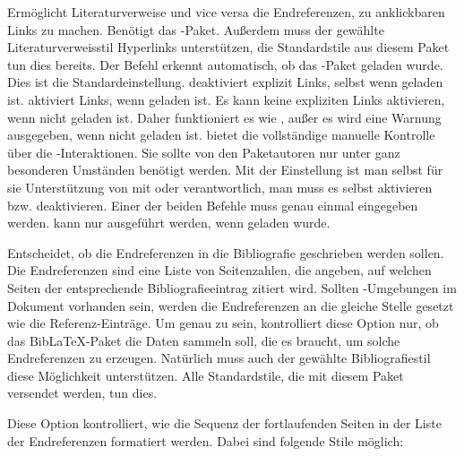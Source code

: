 \documentclass{ltxdockit}[2011/03/25]
\newcommand*{\biblatex}{BibLaTeX\xspace}
\begin{document}
\begin{optionlist}
Ermöglicht Literaturverweise und vice versa die Endreferenzen, zu anklickbaren
Links zu machen. Benötigt das -Paket. Außerdem muss der gewählte
Literaturverweisstil Hyperlinks unterstützen, die Standardstile aus diesem Paket
tun dies bereits. Der Befehl  erkennt automatisch, ob das
-Paket geladen wurde. Dies ist die Standardeinstellung.  deaktiviert explizit Links, selbst wenn 
geladen ist.  aktiviert Links, wenn  geladen
ist. Es kann keine expliziten Links aktivieren, wenn  nicht
geladen ist. Daher funktioniert es wie , außer es wird eine Warnung ausgegeben, wenn  nicht geladen ist.  bietet die vollständige manuelle Kontrolle über die -Interaktionen. Sie sollte von den Paketautoren nur unter ganz besonderen Umständen benötigt werden. Mit der Einstellung 
ist man selbst für sie Unterstützung von  mit  oder  verantwortlich,
man muss es selbst aktivieren bzw. deaktivieren. Einer der beiden Befehle
muss genau einmal eingegeben werden.  kann nur
ausgeführt werden, wenn  geladen wurde.


Entscheidet, ob die Endreferenzen in die Bibliografie geschrieben werden
sollen. Die Endreferenzen sind eine Liste von Seitenzahlen, die angeben, auf welchen
Seiten der entsprechende Bibliografieeintrag zitiert wird. Sollten
-Umgebungen im Dokument vorhanden sein, werden die Endreferenzen
an die gleiche Stelle gesetzt wie die Referenz-Einträge. Um genau zu sein,
kontrolliert diese Option nur, ob das \biblatex-Paket die Daten sammeln
soll, die es braucht, um solche Endreferenzen zu erzeugen. Natürlich muss auch
der gewählte Bibliografiestil diese Möglichkeit unterstützen. Alle Standardstile, die
mit diesem Paket versendet werden, tun dies.


Diese Option kontrolliert, wie die Sequenz der fortlaufenden Seiten in der Liste
der Endreferenzen formatiert werden. Dabei sind folgende Stile möglich:

\begin{valuelist}


\end{valuelist}
\end{optionlist}
\end{document}

